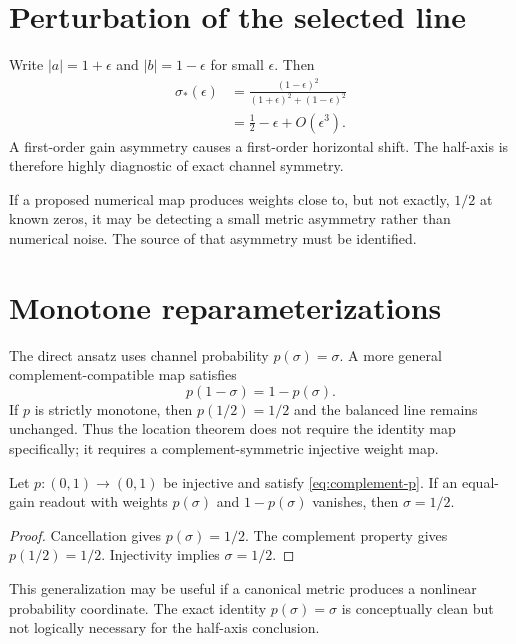 \section{Perturbation of the selected line}

Write $|a|=1+\epsilon$ and $|b|=1-\epsilon$ for small $\epsilon$. Then
\begin{align*}
 \sigma_*(\epsilon)
 &=\frac{(1-\epsilon)^2}{(1+\epsilon)^2+(1-\epsilon)^2}\\
 &=\frac12-\epsilon+O(\epsilon^3).
\end{align*}
A first-order gain asymmetry causes a first-order horizontal shift. The half-axis is therefore highly diagnostic of exact channel symmetry.

If a proposed numerical map produces weights close to, but not exactly, $1/2$ at known zeros, it may be detecting a small metric asymmetry rather than numerical noise. The source of that asymmetry must be identified.

\section{Monotone reparameterizations}

The direct ansatz uses channel probability $p(\sigma)=\sigma$. A more general complement-compatible map satisfies
\begin{equation}
 p(1-\sigma)=1-p(\sigma).
 \label{eq:complement-p}
\end{equation}
If $p$ is strictly monotone, then $p(1/2)=1/2$ and the balanced line remains unchanged. Thus the location theorem does not require the identity map specifically; it requires a complement-symmetric injective weight map.

\begin{proposition}
Let $p:(0,1)\to(0,1)$ be injective and satisfy \cref{eq:complement-p}. If an equal-gain readout with weights $p(\sigma)$ and $1-p(\sigma)$ vanishes, then $\sigma=1/2$.
\end{proposition}
\begin{proof}
Cancellation gives $p(\sigma)=1/2$. The complement property gives $p(1/2)=1/2$. Injectivity implies $\sigma=1/2$.
\end{proof}

This generalization may be useful if a canonical metric produces a nonlinear probability coordinate. The exact identity $p(\sigma)=\sigma$ is conceptually clean but not logically necessary for the half-axis conclusion.

